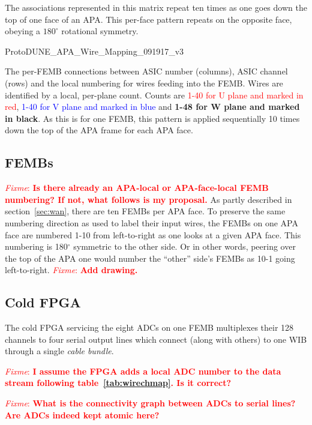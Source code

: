 \documentclass[pdftex,12pt,letter]{article}
\newcommand{\fixme}[1]{\textcolor{red}{\textit{Fixme}: \textbf{#1}}}
\begin{document}
The associations represented in this matrix repeat ten times as one
goes down the top of one face of an APA.  This per-face pattern
repeats on the opposite face, obeying a $180^\circ$ rotational
symmetry.

\begin{table}[htp]
  \label{tab:wirechmap}
  \centering

   {ProtoDUNE_APA_Wire_Mapping_091917_v3}

  \caption{The per-FEMB connections between ASIC number (columns), ASIC channel (rows) and the local numbering for wires feeding into the FEMB.  Wires are identified by a local, per-plane count.  Counts are \textcolor{red}{1-40 for U plane and marked in red}, \textcolor{blue}{1-40 for V plane and marked in blue} and \textbf{1-48 for W plane and marked in black}.  As this is for one FEMB, this pattern is applied sequentially 10 times down the top of the APA frame for each APA face.}
\end{table}

\subsection{FEMBs}
\label{sec:fembs}

\fixme{Is there already an APA-local or APA-face-local FEMB numbering?
  If not, what follows is my proposal.}  As partly described in
section~\ref{sec:wan}, there are ten FEMBs per APA face.  To preserve
the same numbering direction as used to label their input wires, the
FEMBs on one APA face are numbered 1-10 from left-to-right as one
looks at a given APA face.  This numbering is 180$^\circ$ symmetric to
the other side.  Or in other words, peering over the top of the APA
one would number the ``other'' side's FEMBs as 10-1 going
left-to-right.  \fixme{Add drawing.}

\subsection{Cold FPGA}

The cold FPGA servicing the eight ADCs on one FEMB multiplexes their
128 channels to four serial output lines which connect (along with
others) to one WIB through a single \textit{cable bundle}.

\fixme{I assume the FPGA adds a local ADC number to the data stream following table~\ref{tab:wirechmap}.  Is it correct?}

\fixme{What is the connectivity graph between ADCs to serial lines?  Are ADCs indeed kept atomic here?}
\end{document}
